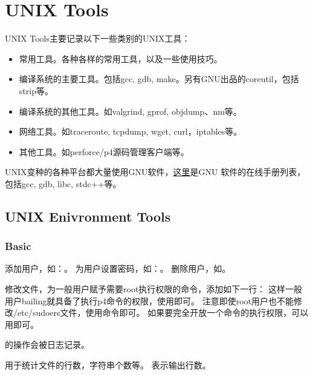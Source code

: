 \part{UNIX Tools}

UNIX Tools主要记录以下一些类别的UNIX工具：
\begin{itemize}
\item 常用工具。各种各样的常用工具，以及一些使用技巧。
\item 编译系统的主要工具。包括gcc, gdb, make。另有GNU出品的coreutil，包括strip等。
\item 编译系统的其他工具。如valgrind, gprof, objdump、nm等。
\item 网络工具。如traceroute, tcpdump, wget, curl，iptables等。
\item 其他工具。如perforce/p4源码管理客户端等。
\end{itemize}

UNIX变种的各种平台都大量使用GNU软件，\href{http://www.gnu.org/manual/manual.html}{这里}是GNU
软件的在线手册列表，包括gcc, gdb, libc, stdc++等。

\chapter{UNIX Enivronment Tools}

\section{Basic}
添加用户，如：。
为用户设置密码，如：。
删除用户，如。

修改文件，为一般用户赋予需要root执行权限的命令，添加如下一行：
这样一般用户bailing就具备了执行p4命令的权限，使用即可。
注意即使root用户也不能修改/etc/sudoers文件，使用命令即可。
如果要完全开放一个命令的执行权限，可以用即可。

的操作会被日志记录。

用于统计文件的行数，字符串个数等。
表示输出行数。

